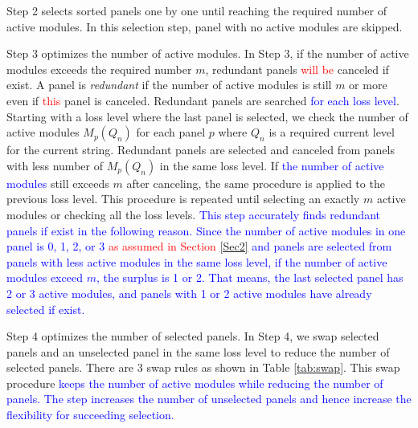 \documentclass[conference]{pvsctran}
\newcommand{\michiko}{\textcolor{blue}}
\newcommand{\zhao}{\textcolor{red}}
\begin{document}
Step 2 selects sorted panels one by one until reaching the required number of active modules.
In this selection step, panel with no active modules are skipped.

Step 3 optimizes the number of active modules. 
In Step 3, if the number of active modules exceeds the required number $m$, redundant panels \zhao{will be} canceled if exist. 
A panel is \textit{redundant} if the number of active modules is still $m$ or more even if \zhao{this} panel is canceled.  
Redundant panels are searched \michiko{for each loss level}. 
Starting with a loss level where the last panel is selected, we check the number of active modules $M_{p}(Q_{n})$ for each panel $p$ 
where $Q_{n}$ is a required current level for the current string.
Redundant panels are selected and canceled from panels with less number of $M_{p}(Q_{n})$ in the same loss level. 
If \michiko{the number of active modules} still exceeds $m$ after canceling,
the same procedure is applied to the previous loss level.
This procedure is repeated until selecting an exactly $m$ active modules or checking all the loss levels.
\michiko{This step accurately finds redundant panels if exist in the following reason. Since the number of active modules in one panel is 0, 1, 2, or 3 \zhao{as assumed in Section \ref{Sec2}} and panels are selected from panels with less active modules in the same loss level, if the number of active modules exceed $m$, the surplus is 1 or 2. That means, the last selected panel has 2 or 3 active modules, and panels with 1 or 2 active modules have already selected if exist.}

Step 4 optimizes the number of selected panels.
In Step 4, we swap selected panels and an unselected panel in the same loss level to reduce the number of selected panels.
There are 3 swap rules as shown in Table \ref{tab:swap}.
This swap procedure \michiko{keeps the number of active modules while reducing the number of panels. The step increases the number of unselected panels and hence increase the flexibility for succeeding selection.}
\end{document}
